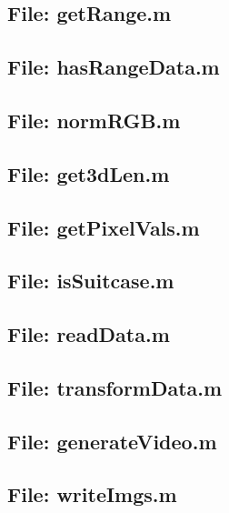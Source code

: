 \documentclass[10pt,a4paper]{article}
\begin{document}
\subsection{File: getRange.m}

\subsection{File: hasRangeData.m}



\subsection{File: normRGB.m}


\subsection{File: get3dLen.m}


\subsection{File: getPixelVals.m}


\subsection{File: isSuitcase.m}


\subsection{File: readData.m}

\subsection{File: transformData.m}


\subsection{File: generateVideo.m}

\subsection{File: writeImgs.m}

\end{document}

